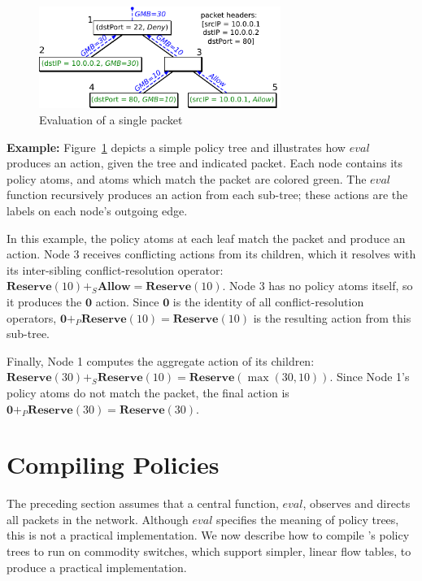 \begin{figure}
\centering
\includegraphics[width=0.7\textwidth]{figs/evaltree}
\caption{Evaluation of a single packet}
\label{f:evaltree}
\end{figure}


\vspace{0.5em}\noindent\textbf{Example:\space}
Figure~\ref{f:evaltree} depicts a simple policy tree
and illustrates how $\mathit{eval}$ produces an action, given the 
tree and indicated packet.
Each node contains its policy atoms, and atoms which match the packet are colored
green. The $\mathit{eval}$ function recursively produces an action from
each sub-tree; these actions are the labels on each node's outgoing edge.

In this example, the policy atoms at each leaf match the packet and produce
an action.
Node $3$ receives conflicting actions
from its children, which it resolves with its inter-sibling
conflict-resolution operator:
$\textbf{Reserve}(10)
+_S \textbf{Allow} = \textbf{Reserve}(10)$. Node $3$ has no policy atoms
itself, so it produces the $\textbf{0}$ action. Since $\textbf{0}$ is
the identity of all conflict-resolution operators,
  $\textbf{0} +_P \textbf{Reserve}(10) = \textbf{Reserve}(10)$ is the
resulting action from this sub-tree. 

Finally, Node 1 computes the aggregate action of its children:
$\textbf{Reserve}(30) +_S \textbf{Reserve}(10) = \textbf{Reserve}(\max(30,10))$.
Since Node 1's policy atoms do not match the packet,
the final action is
$\textbf{0} +_P \textbf{Reserve}(30) = \textbf{Reserve}(30)$.


\section{Compiling Policies}\label{s:lin}

The preceding section assumes that a central function,
$\mathit{eval}$, observes and directs all packets in the network.
Although $\mathit{eval}$ specifies the meaning of policy trees, this is not a
practical implementation. We now describe how to compile \treelang's
policy trees to run on commodity switches, which support simpler, linear
flow tables, to produce a practical implementation.

